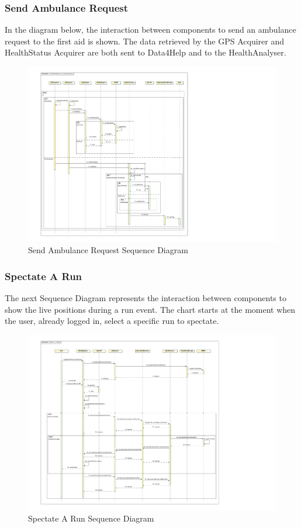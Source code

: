 \subsubsection{Send Ambulance Request}
In the diagram below, the interaction between components to send an ambulance request to the first aid is shown. The data retrieved by the GPS Acquirer and HealthStatus Acquirer are both sent to Data4Help and to the HealthAnalyser.
\\[0.5cm]
\begin{figure}[H]
\centering
\includegraphics[scale=0.93, angle=0,origin=c]{Images/SequenceDiagrams/SendAmbulance.pdf}
\caption{Send Ambulance Request Sequence Diagram}
\clearpage
\end{figure}
\newpage
\subsubsection{Spectate A Run}
The next Sequence Diagram represents the interaction between components to show the live positions during a run event. The chart starts at the moment when the user, already logged in, select a specific run to spectate.
\\[1.0cm]
\begin{figure}[H]
\centering
\includegraphics[scale=0.8, angle=0,origin=c]{Images/SequenceDiagrams/SpectateRun.pdf}
\caption{Spectate A Run Sequence Diagram}
\end{figure}
\clearpage


